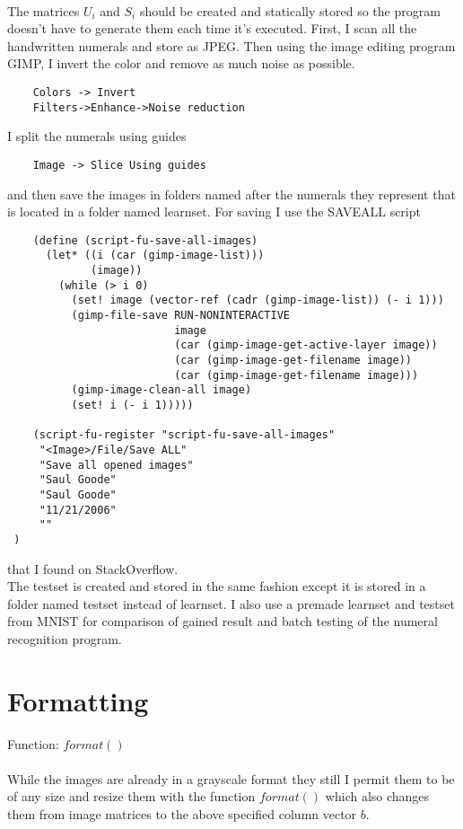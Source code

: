 \documentclass{article}
\begin{document}
	\paragraph{}
	The matrices $U_i$ and $S_i$ should be created and statically stored so the program doesn’t have to generate them each time it’s executed.
	First, I scan all the handwritten numerals and store as JPEG. Then using the image editing program GIMP, I invert the color and remove as much noise as possible.
	\begin{lstlisting}
	Colors -> Invert
	Filters->Enhance->Noise reduction
	\end{lstlisting}
	I split the numerals using guides
	\begin{lstlisting}
	Image -> Slice Using guides
	\end{lstlisting}
	and then save the images in folders named after the numerals they represent that is located in a folder named learnset.
	For saving I use the SAVEALL script
	\begin{lstlisting}	
	(define (script-fu-save-all-images) 
	  (let* ((i (car (gimp-image-list))) 
	         (image)) 
	    (while (> i 0) 
	      (set! image (vector-ref (cadr (gimp-image-list)) (- i 1))) 
	      (gimp-file-save RUN-NONINTERACTIVE 
	                      image 
	                      (car (gimp-image-get-active-layer image)) 
	                      (car (gimp-image-get-filename image)) 
	                      (car (gimp-image-get-filename image))) 
	      (gimp-image-clean-all image) 
	      (set! i (- i 1))))) 
	
	(script-fu-register "script-fu-save-all-images" 
	 "<Image>/File/Save ALL" 
	 "Save all opened images" 
	 "Saul Goode" 
	 "Saul Goode" 
	 "11/21/2006" 
	 "" 
 ) 
	\end{lstlisting}
	that I found on StackOverflow\cite{saveall}.\\
	\newpage
	The testset is created and stored in the same fashion except it is stored in a folder named testset instead of learnset.
	I also use a premade learnset and testset from MNIST\cite{mnist} for comparison of gained result and batch testing of the numeral recognition program.
	
	\section{Formatting}
	Function: $format()$
	
	\paragraph{}
	While the images are already in a grayscale format they still I permit them to be of any size and resize them with the function $format()$ which also changes them from image matrices to the above specified column vector $b$.
	
\end{document}
